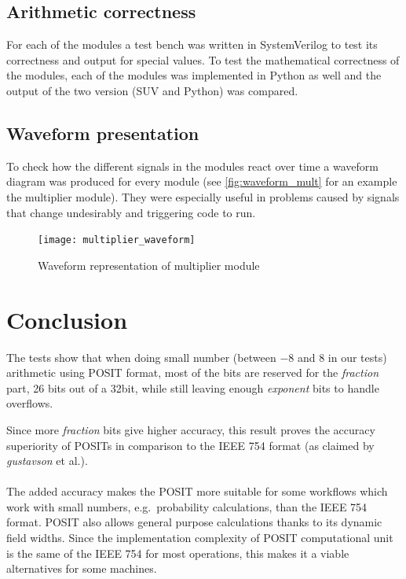 \documentclass[10pt]{article}
\begin{document}
\subsection{Arithmetic correctness}\label{sec:arithm-corr}

For each of the modules a test bench was written in SystemVerilog to test its
correctness and output for special values.
To test the mathematical correctness of the modules, each of the modules was
implemented in Python as well and the output of the two version (SUV and Python)
was compared.

\subsection{Waveform presentation}\label{sec:waveform-testing}

To check how the different signals in the modules react over time a waveform
diagram was produced for every module (see \autoref{fig:waveform_mult} for an
example the multiplier module). They were especially useful in problems
caused by signals that change undesirably and triggering code to run.

\begin{figure}[]
  \centering
  \texttt{[image: multiplier\_waveform]}
  \caption{Waveform representation of multiplier module}
  \label{fig:waveform_mult}
\end{figure}

\section{Conclusion}\label{sec:conclusion}

The tests show that when doing small number (between $-8$ and $8$ in our tests)
arithmetic using POSIT format, most of the bits are reserved for the
\textit{fraction} part, 26 bits out of a 32bit, while still leaving enough
\textit{exponent} bits to handle overflows.

Since more \textit{fraction} bits give higher accuracy, this result proves the
accuracy superiority of POSITs in comparison to the IEEE 754 format (as claimed
by \textit{gustavson} et al.\cite{gustavson}).

\paragraph{}
The added accuracy makes the POSIT more suitable for some workflows which work
with small numbers, e.g.\ probability calculations, than the IEEE 754 format.
POSIT also allows general purpose calculations thanks to its dynamic field
widths. Since the implementation complexity of POSIT computational unit is the
same of the IEEE 754 for most operations, this makes it a viable alternatives
for some machines.
\end{document}
